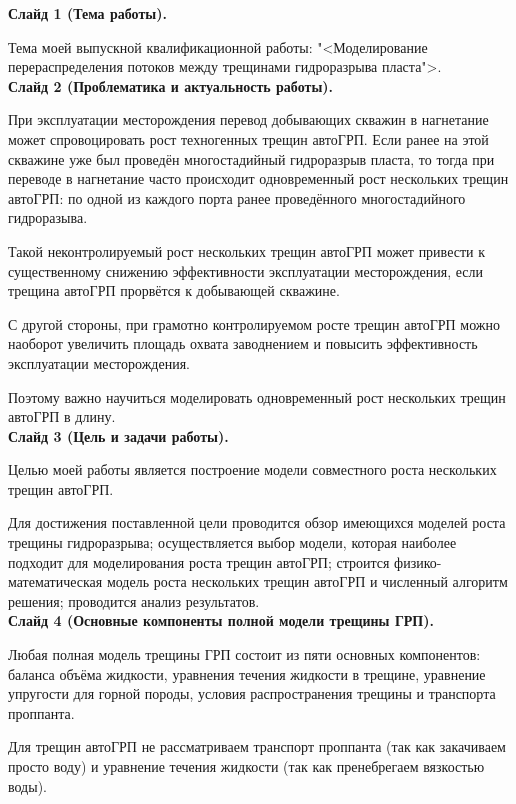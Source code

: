 \documentclass[a4paper, 12pt]{article}
\begin{document}

\textbf{Слайд 1 (Тема работы).}

Тема моей выпускной квалификационной работы: "<Моделирование перераспределения потоков между трещинами гидроразрыва пласта">.
\\

\textbf{Слайд 2 (Проблематика и актуальность работы).}

При эксплуатации месторождения перевод добывающих скважин в нагнетание может спровоцировать рост техногенных трещин автоГРП.
Если ранее на этой скважине уже был проведён многостадийный гидроразрыв пласта, то тогда при переводе в нагнетание часто происходит одновременный рост нескольких трещин автоГРП: по одной из каждого порта ранее проведённого многостадийного гидроразыва.

Такой неконтролируемый рост нескольких трещин автоГРП может привести к существенному снижению эффективности эксплуатации месторождения, если трещина автоГРП прорвётся к добывающей скважине.

С другой стороны, при грамотно контролируемом росте трещин автоГРП можно наоборот увеличить площадь охвата заводнением и повысить эффективность эксплуатации месторождения.

Поэтому важно научиться моделировать одновременный рост нескольких трещин автоГРП в длину.
\\ 

\textbf{Слайд 3 (Цель и задачи работы).}

Целью моей работы является построение модели совместного роста нескольких трещин автоГРП.

Для достижения поставленной цели проводится обзор имеющихся моделей роста трещины гидроразрыва;
осуществляется выбор модели, которая наиболее подходит для моделирования роста трещин автоГРП;
строится физико-математическая модель роста нескольких трещин автоГРП и численный алгоритм решения;
проводится анализ результатов.
\\


\textbf{Слайд 4 (Основные компоненты полной модели трещины ГРП).}

Любая полная модель трещины ГРП состоит из пяти основных компонентов: баланса объёма жидкости, уравнения течения жидкости в трещине, уравнение упругости для горной породы, условия распространения трещины и транспорта проппанта.

Для трещин автоГРП не рассматриваем транспорт проппанта (так как закачиваем просто воду) и уравнение течения жидкости (так как пренебрегаем вязкостью воды).
\end{document}
